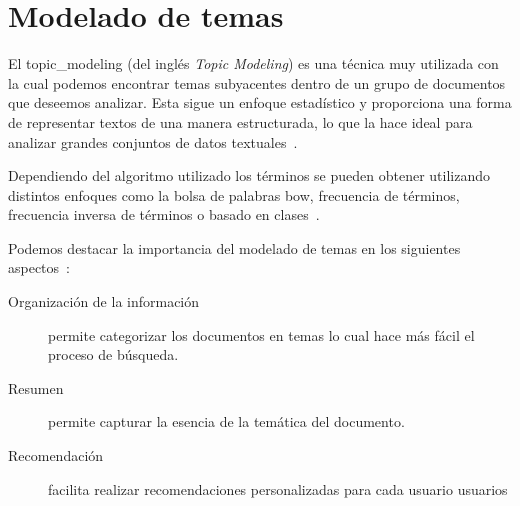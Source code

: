 \section{Modelado de temas}

El \gls{topic_modeling} (del inglés \textit{Topic Modeling}) es una técnica muy
utilizada con la cual podemos encontrar temas subyacentes dentro de un grupo de
documentos que deseemos analizar. Esta sigue un enfoque estadístico y
proporciona una forma de representar textos de una manera estructurada, lo que
la hace ideal para analizar grandes conjuntos de datos
textuales~\cite{bismiTopicModellingUsing2023a}.

Dependiendo del algoritmo utilizado los términos se pueden obtener utilizando
distintos enfoques como la bolsa de palabras \acrshort{bow}, frecuencia de
términos, frecuencia inversa de términos o basado en
clases~\cite{phdTopicModelingAlgorithms2023}.

Podemos destacar la importancia del modelado de temas en los siguientes
aspectos~\cite{bismiTopicModellingUsing2023a}:

\begin{description}
	\item[Organización de la información] permite categorizar los documentos en temas lo
	      cual hace más fácil el proceso de búsqueda.
	\item[Resumen] permite capturar la esencia de la temática del documento.
	\item[Recomendación] facilita realizar recomendaciones personalizadas para cada
	      usuario usuarios
\end{description}

